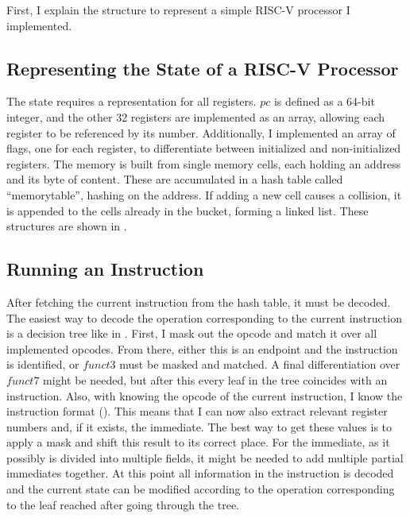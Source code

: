 First, I explain the structure to represent a simple RISC-V processor
I implemented.

\subsection{Representing the State of a RISC-V Processor}
The state requires a representation for all registers. $pc$ is
defined as a 64-bit integer, and the other 32 registers are
implemented as an array, allowing each register to be referenced by
its number. Additionally, I implemented an array of flags, one for
each register, to differentiate between initialized and
non-initialized registers. The memory is built from single memory
cells, each holding an address and its byte of content. These are
accumulated in a hash table called \enquote{memorytable}, hashing on
the address. If adding a new cell causes a collision, it is appended
to the cells already in the bucket, forming a linked list. These
structures are shown in .



\subsection{Running an Instruction}\label{sec:runInstr}
After fetching the current instruction from the hash table, it must
be decoded. The easiest way to decode the operation corresponding to
the current instruction is a decision tree like in .
First, I mask out the opcode and match it over all implemented
opcodes. From there, either this is an endpoint and the instruction
is identified, or $funct3$ must be masked and matched. A final
differentiation over $funct7$ might be needed, but after this every
leaf in the tree coincides with an instruction. Also, with knowing
the opcode of the current instruction, I know the instruction format
(). This means that I can now also extract
relevant register numbers and, if it exists, the immediate. The best
way to get these values is to apply a mask and shift this result to
its correct place. For the immediate, as it possibly is divided into
multiple fields, it might be needed to add multiple partial
immediates together. At this point all information in the instruction
is decoded and the current state can be modified according to the
operation corresponding to the leaf reached after going through the
tree.



